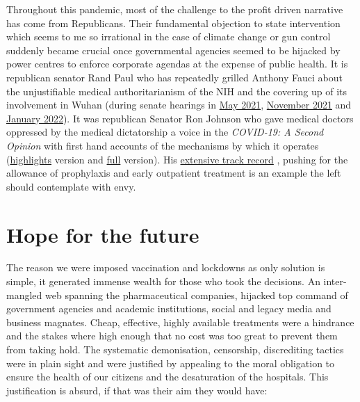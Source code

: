 \documentclass[11pt,a4paper,notitlepage]{report}
\begin{document}
Throughout this pandemic, most of the challenge to the profit driven narrative has come from Republicans. Their fundamental objection to state intervention which seems to me so irrational in the case of climate change or gun control suddenly became crucial once governmental agencies seemed to be hijacked by power centres to enforce corporate agendas at the expense of public health. It is republican senator Rand Paul who has repeatedly grilled Anthony Fauci about the unjustifiable medical authoritarianism of the NIH and the covering up of its involvement in Wuhan (during senate hearings in \href{https://www.youtube.com/watch?v=2MndwrOzDvo}{May 2021}, \href{https://www.youtube.com/watch?v=JBqXYpO1QpE}{November 2021} and \href{https://www.youtube.com/watch?v=kz7OGxb9X6E}{January 2022}). It was republican Senator Ron Johnson who gave medical doctors oppressed by the medical dictatorship a voice in the \textit{COVID-19: A Second Opinion} with first hand accounts of the mechanisms by which it operates (\href{https://www.youtube.com/watch?v=9jMONZMuS2U}{highlights} version and \href{https://rumble.com/vt62y6-covid-19-a-second-opinion.html}{full} version). His \href{https://www.ronjohnson.senate.gov/covid}{extensive track record} \cite{senator-ron-johnson}, pushing for the allowance of prophylaxis and early outpatient treatment is an example the left should contemplate with envy.


\section*{Hope for the future}

The reason we were imposed vaccination and lockdowns as only solution is simple, it generated immense wealth for those who took the decisions. An inter-mangled web spanning the pharmaceutical companies, hijacked top command of government agencies and academic institutions, social and legacy media and business magnates. Cheap, effective, highly available treatments were a hindrance and the stakes where high enough that no cost was too great to prevent them from taking hold. The systematic demonisation, censorship, discrediting tactics were in plain sight and were justified by appealing to the moral obligation to ensure the health of our citizens and the desaturation of the hospitals. This justification is absurd, if that was their aim they would have:

\end{document}
